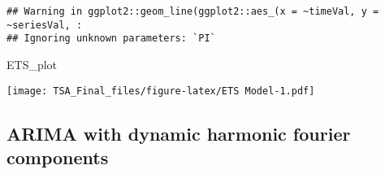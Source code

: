 \documentclass[
]{article}
\newenvironment{Shaded}{\begin{snugshade}}{\end{snugshade}}
\newcommand{\AttributeTok}[1]{\textcolor[rgb]{0.77,0.63,0.00}{#1}}
\newcommand{\ConstantTok}[1]{\textcolor[rgb]{0.00,0.00,0.00}{#1}}
\newcommand{\DecValTok}[1]{\textcolor[rgb]{0.00,0.00,0.81}{#1}}
\newcommand{\FunctionTok}[1]{\textcolor[rgb]{0.00,0.00,0.00}{#1}}
\newcommand{\NormalTok}[1]{#1}
\newcommand{\OtherTok}[1]{\textcolor[rgb]{0.56,0.35,0.01}{#1}}
\newcommand{\SpecialCharTok}[1]{\textcolor[rgb]{0.00,0.00,0.00}{#1}}
\newcommand{\StringTok}[1]{\textcolor[rgb]{0.31,0.60,0.02}{#1}}
\begin{document}
\begin{Shaded}
\end{Shaded}

\begin{verbatim}
## Warning in ggplot2::geom_line(ggplot2::aes_(x = ~timeVal, y = ~seriesVal, :
## Ignoring unknown parameters: `PI`
\end{verbatim}

\begin{Shaded}
\begin{Highlighting}[]
\NormalTok{ETS\_plot}
\end{Highlighting}
\end{Shaded}

\texttt{[image: TSA\_Final\_files/figure-latex/ETS Model-1.pdf]}

\hypertarget{arima-with-dynamic-harmonic-fourier-components}{%
\subsection{ARIMA with dynamic harmonic fourier
components}\label{arima-with-dynamic-harmonic-fourier-components}}
\end{document}
